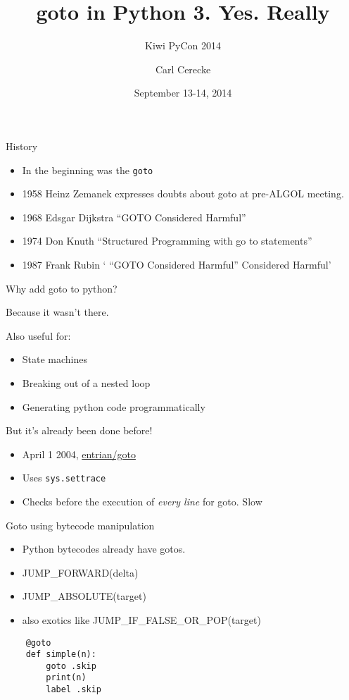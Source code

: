 \documentclass{beamer}
\title{goto in Python 3. Yes. Really}
\subtitle{Kiwi PyCon 2014}
\author{Carl Cerecke}
\date{September 13-14, 2014}
\begin{document}
    \begin{frame}[plain]
        \titlepage
    \end{frame}

\begin{frame}{History}

\begin{itemize}
\item In the beginning was the \texttt{goto}
\item 1958 Heinz Zemanek expresses doubts about goto at pre-ALGOL meeting.
\item 1968 Edsgar Dijkstra ``GOTO Considered Harmful''
\item 1974 Don Knuth ``Structured Programming with go to statements''
\item 1987 Frank Rubin ` ``GOTO Considered Harmful'' Considered Harmful'
\end{itemize}

\end{frame}

\begin{frame}{Why add goto to python?}

Because it wasn't there.

Also useful for:
\begin{itemize}
\item State machines
\item Breaking out of a nested loop
\item Generating python code programmatically
\end{itemize}

\end{frame}

\begin{frame}{But it's already been done before!}

\begin{itemize}
\item April 1 2004, \href{http://entrian/goto}{entrian/goto}

\item Uses \texttt{sys.settrace}

\item Checks before the execution of \emph{every line} for goto. Slow
\end{itemize}
\end{frame}

\begin{frame}[fragile]{Goto using bytecode manipulation}

\begin{itemize}
\item Python bytecodes already have gotos.
\item JUMP\_FORWARD(delta)
\item JUMP\_ABSOLUTE(target)
\item also exotics like JUMP\_IF\_FALSE\_OR\_POP(target)
\end{itemize}

\begin{verbatim}
    @goto
    def simple(n):
        goto .skip
        print(n)
        label .skip
\end{verbatim}

\end{frame}
\end{document}
